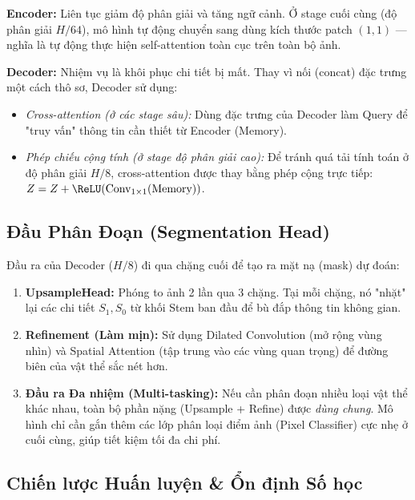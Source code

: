 \documentclass[conference]{IEEEtran}
\begin{document}
\textbf{Encoder:} Liên tục giảm độ phân giải và tăng ngữ cảnh. Ở stage cuối cùng (độ phân giải $H/64$), mô hình tự động chuyển sang dùng kích thước patch $(1,1)$ --- nghĩa là tự động thực hiện self-attention toàn cục trên toàn bộ ảnh.

\textbf{Decoder:} Nhiệm vụ là khôi phục chi tiết bị mất. Thay vì nối (concat) đặc trưng một cách thô sơ, Decoder sử dụng:
\begin{itemize}
    \item \textit{Cross-attention (ở các stage sâu):} Dùng đặc trưng của Decoder làm Query để "truy vấn" thông tin cần thiết từ Encoder (Memory).
    \item \textit{Phép chiếu cộng tính (ở stage độ phân giải cao):} Để tránh quá tải tính toán ở độ phân giải $H/8$, cross-attention được thay bằng phép cộng trực tiếp: $Z = Z + \ReLU(\text{Conv}_{1\times1}(\text{Memory}))$.
\end{itemize}

\subsection{Đầu Phân Đoạn (Segmentation Head)}

Đầu ra của Decoder ($H/8$) đi qua chặng cuối để tạo ra mặt nạ (mask) dự đoán:

\begin{enumerate}
    \item \textbf{UpsampleHead:} Phóng to ảnh 2 lần qua 3 chặng. Tại mỗi chặng, nó "nhặt" lại các chi tiết $S_1, S_0$ từ khối Stem ban đầu để bù đắp thông tin không gian.
    \item \textbf{Refinement (Làm mịn):} Sử dụng Dilated Convolution (mở rộng vùng nhìn) và Spatial Attention (tập trung vào các vùng quan trọng) để đường biên của vật thể sắc nét hơn.
    \item \textbf{Đầu ra Đa nhiệm (Multi-tasking):} Nếu cần phân đoạn nhiều loại vật thể khác nhau, toàn bộ phần nặng (Upsample + Refine) được \textit{dùng chung}. Mô hình chỉ cần gắn thêm các lớp phân loại điểm ảnh (Pixel Classifier) cực nhẹ ở cuối cùng, giúp tiết kiệm tối đa chi phí.
\end{enumerate}

\subsection{Chiến lược Huấn luyện \& Ổn định Số học}
\end{document}
